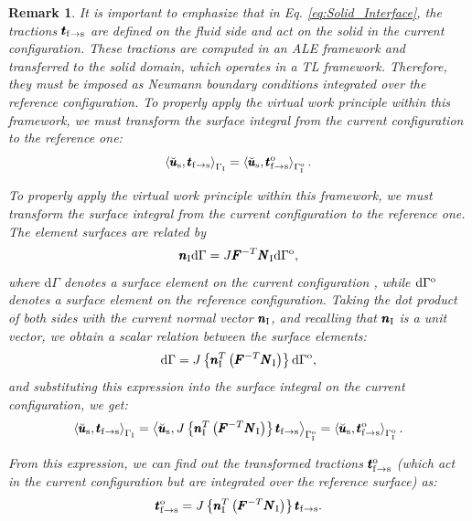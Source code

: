 \documentclass[11pt,english]{article}
\def\testusolid{\breve{\pmb{u}}_{\rm{s}}}       %
\def\boundaryFSI{\Gamma_{\rm{I}}}
\def\boundaryFSIreference{\Gamma_{\rm{I}}^{\rm{o}}}
\def\FSItract{\pmb{t}_{\rm{f}\to{\rm{s}}}}
\def\FSItractref{\FSItract^{\rm{o}}}
\def\NormalFSI{\pmb{N}_{\rm{I}}}
\def\normalFSI{\pmb{n}_{\rm{I}}}
\newtheorem{remark}{Remark}[section]
\begin{document}
\begin{remark}
It is important to emphasize that in Eq. \eqref{eq:Solid_Interface}, the tractions $\FSItract$ are defined on the fluid side and act on the solid in the current configuration. These tractions are computed in an ALE framework and transferred to the solid domain, which operates in a TL framework. Therefore, they must be imposed as Neumann boundary conditions integrated over the reference configuration. To properly apply the virtual work principle within this framework, we must transform the surface integral from the current configuration to the reference one:
\begin{equation*}
    \left \langle \testusolid, \FSItract \right \rangle_{\boundaryFSI} = \left \langle \testusolid, \FSItractref \right \rangle_{\boundaryFSIreference}. 
\end{equation*}

To properly apply the virtual work principle within this framework, we must transform the surface integral from the current configuration to the reference one. The element surfaces are related by
\begin{equation}
    \normalFSI \mathrm{d}\Gamma = J \pmb{F}^{-T} \NormalFSI \mathrm{d}\Gamma^{\rm{o}} \label{eq:Nansons_formula},
\end{equation}
where $\mathrm{d}\Gamma$ denotes a surface element on the current configuration , while $\mathrm{d}\Gamma^{\rm{o}}$ denotes a surface element on the reference configuration. Taking the dot product of both sides with the current normal vector $\normalFSI$, and recalling that $\normalFSI$ is a unit vector, we obtain a scalar relation between the surface elements:
\begin{equation*}
    \mathrm{d}\Gamma = J \left \lbrace \normalFSI^T \left( \pmb{F}^{-T} \NormalFSI \right) \right \rbrace \mathrm{d}\Gamma^{\rm{o}},
\end{equation*}
and substituting this expression into the surface integral on the current configuration, we get:
\begin{equation*}
    \left \langle \testusolid, \FSItract \right \rangle_{\boundaryFSI} =  \left \langle \testusolid, J \left \lbrace \normalFSI^T \left( \pmb{F}^{-T} \NormalFSI \right) \right \rbrace \FSItract \right \rangle_{\boundaryFSIreference}   =\left \langle \testusolid, \FSItractref \right \rangle_{\boundaryFSIreference}. 
\end{equation*}

From this expression, we can find out the transformed tractions $\FSItractref$ (which act in the current configuration but are integrated over the reference surface) as:
\begin{equation*}
    \FSItractref =  J \left \lbrace \normalFSI^T \left( \pmb{F}^{-T} \NormalFSI \right) \right \rbrace \FSItract.
\end{equation*}


\end{remark}
\end{document}
